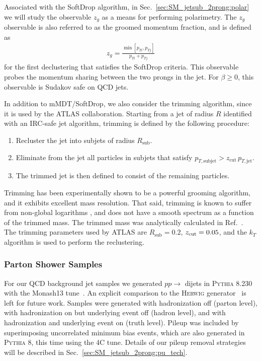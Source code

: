 Associated with the SoftDrop algorithm, in Sec.~\ref{sec:SM_jetsub_2prong:polar} we will study the observable $z_g$ as a means for performing polarimetry.
%
The $z_g$ observable is also referred to as the groomed momentum fraction, and is defined as
%
\begin{align}
z_g=\frac{\min\left[ p_{Ti}, p_{Tj}  \right]}{p_{Ti}+p_{Tj}}
\end{align}
%
for the first declustering that satisfies the SoftDrop criteria.
%
This observable probes the momentum sharing between the two prongs in the
jet. For $\beta \ge 0$, this observable is Sudakov safe \cite{Larkoski:2013paa,Larkoski:2015lea} on QCD
jets.

In addition to mMDT/SoftDrop, we also consider the trimming algorithm, since it is used by the ATLAS collaboration.
%
Starting from a jet of radius $R$ identified with an IRC-safe jet algorithm, trimming is defined by the following procedure:
%
\begin{enumerate}
%
\item Recluster the jet into subjets of radius $R_{\text{sub}}$.
%
\item Eliminate from the jet all particles in subjets that satisfy
  $p_{T,\text{subjet}} > z_{\text{cut}} \, p_{T,\text{jet}}$.
%
\item The trimmed jet is then defined to consist of the remaining particles.
%
\end{enumerate}
%
Trimming has been experimentally shown to be a powerful grooming algorithm, and it exhibits excellent mass resolution.
%
That said, trimming is known to suffer from non-global logarithms \cite{Dasgupta:2001sh}, and does not have a smooth spectrum as a function of the trimmed mass.
%
The trimmed mass was analytically calculated in Ref.~\cite{Dasgupta:2013ihk}.
%
The trimming parameters used by ATLAS are $R_{\text{sub}}=0.2$,  $ {z_{\rm cut}}=0.05$, and the $k_T$ algorithm is used to perform the reclustering.


\subsubsection{Parton Shower Samples}\label{sec:SM_jetsub_2prong:samples_sub}



For our QCD background jet samples we generated $pp\to$ dijets in
\textsc{Pythia} 8.230~\cite{Sjostrand:2006za,Sjostrand:2007gs} with
the Monash13 tune~\cite{Skands:2014pea}. 
%
An explicit comparison to the \textsc{Herwig}
generator~\cite{Bahr:2008pv,Bellm:2015jjp} is left for future work.
%
Samples were generated with hadronization off (parton level), with
hadronization on but underlying event off (hadron level), and with
hadronization and underlying event on (truth level). Pileup was
included by superimposing uncorrelated minimum bias events, which are
also generated in \textsc{Pythia} 8, this time using the 4C
tune. Details of our pileup removal strategies will be described in
Sec.~\ref{sec:SM_jetsub_2prong:pu_tech}.

